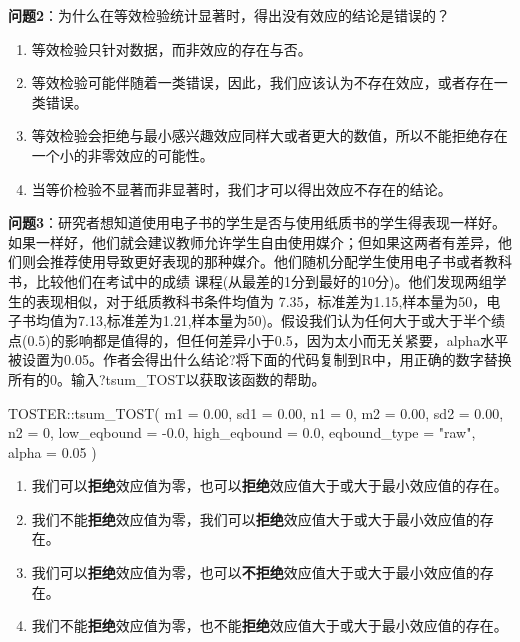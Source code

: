 \documentclass[
  letterpaper,
  DIV=11,
  numbers=noendperiod]{scrreprt}
\newenvironment{Shaded}{\begin{snugshade}}{\end{snugshade}}
\newcommand{\AttributeTok}[1]{\textcolor[rgb]{0.40,0.45,0.13}{#1}}
\newcommand{\DecValTok}[1]{\textcolor[rgb]{0.68,0.00,0.00}{#1}}
\newcommand{\FloatTok}[1]{\textcolor[rgb]{0.68,0.00,0.00}{#1}}
\newcommand{\FunctionTok}[1]{\textcolor[rgb]{0.28,0.35,0.67}{#1}}
\newcommand{\NormalTok}[1]{\textcolor[rgb]{0.00,0.23,0.31}{#1}}
\newcommand{\SpecialCharTok}[1]{\textcolor[rgb]{0.37,0.37,0.37}{#1}}
\newcommand{\StringTok}[1]{\textcolor[rgb]{0.13,0.47,0.30}{#1}}
\providecommand{\tightlist}{%
  \setlength{\itemsep}{0pt}\setlength{\parskip}{0pt}}\usepackage{longtable,booktabs,array}
\begin{document}
\textbf{问题2}：为什么在等效检验统计显著时，得出没有效应的结论是错误的？

\begin{enumerate}
\def\labelenumi{\Alph{enumi})}
\tightlist
\item
  等效检验只针对数据，而非效应的存在与否。
\item
  等效检验可能伴随着一类错误，因此，我们应该认为不存在效应，或者存在一类错误。
\item
  等效检验会拒绝与最小感兴趣效应同样大或者更大的数值，所以不能拒绝存在一个小的非零效应的可能性。
\item
  当等价检验不显著而非显著时，我们才可以得出效应不存在的结论。
\end{enumerate}

\textbf{问题3}：研究者想知道使用电子书的学生是否与使用纸质书的学生得表现一样好。如果一样好，他们就会建议教师允许学生自由使用媒介；但如果这两者有差异，他们则会推荐使用导致更好表现的那种媒介。他们随机分配学生使用电子书或者教科书，比较他们在考试中的成绩
课程(从最差的1分到最好的10分)。他们发现两组学生的表现相似，对于纸质教科书条件均值为
7.35，标准差为1.15,样本量为50，电子书均值为7.13,标准差为1.21,样本量为50)。假设我们认为任何大于或大于半个绩点(0.5)的影响都是值得的，但任何差异小于0.5，因为太小而无关紧要，alpha水平被设置为0.05。作者会得出什么结论?将下面的代码复制到R中，用正确的数字替换所有的0。输入?tsum\_TOST以获取该函数的帮助。

\begin{Shaded}
\begin{Highlighting}[]
\NormalTok{TOSTER}\SpecialCharTok{::}\FunctionTok{tsum\_TOST}\NormalTok{(}
  \AttributeTok{m1 =} \FloatTok{0.00}\NormalTok{,}
  \AttributeTok{sd1 =} \FloatTok{0.00}\NormalTok{,}
  \AttributeTok{n1 =} \DecValTok{0}\NormalTok{,}
  \AttributeTok{m2 =} \FloatTok{0.00}\NormalTok{,}
  \AttributeTok{sd2 =} \FloatTok{0.00}\NormalTok{,}
  \AttributeTok{n2 =} \DecValTok{0}\NormalTok{,}
  \AttributeTok{low\_eqbound =} \SpecialCharTok{{-}}\FloatTok{0.0}\NormalTok{,}
  \AttributeTok{high\_eqbound =} \FloatTok{0.0}\NormalTok{,}
  \AttributeTok{eqbound\_type =} \StringTok{"raw"}\NormalTok{,}
  \AttributeTok{alpha =} \FloatTok{0.05}
\NormalTok{)}
\end{Highlighting}
\end{Shaded}

\begin{enumerate}
\def\labelenumi{\Alph{enumi})}
\tightlist
\item
  我们可以\textbf{拒绝}效应值为零，也可以\textbf{拒绝}效应值大于或大于最小效应值的存在。
\item
  我们不能\textbf{拒绝}效应值为零，我们可以\textbf{拒绝}效应值大于或大于最小效应值的存在。
\item
  我们可以\textbf{拒绝}效应值为零，也可以\textbf{不拒绝}效应值大于或大于最小效应值的存在。
\item
  我们不能\textbf{拒绝}效应值为零，也不能\textbf{拒绝}效应值大于或大于最小效应值的存在。
\end{enumerate}
\end{document}
